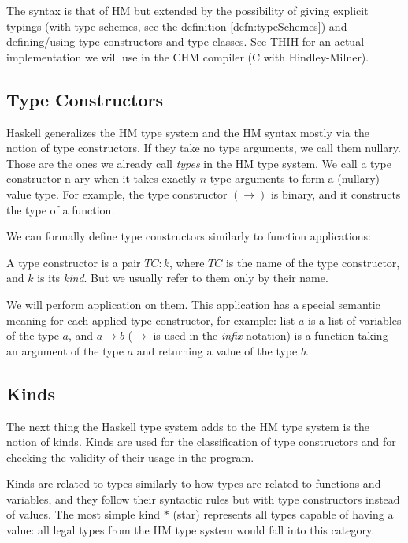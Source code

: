 The syntax is that of HM but extended by the possibility of giving explicit typings (with type schemes, see the definition \ref{defn:typeSchemes}) and defining/using type constructors and type classes. See THIH \cite{jones1999typing} for an actual implementation we will use in the CHM compiler (C with Hindley-Milner).

\subsection{Type Constructors}

Haskell generalizes the HM type system and the HM syntax mostly via the notion of type constructors. If they take no type arguments, we call them nullary. Those are the ones we already call \emph{types} in the HM type system. We call a type constructor n-ary when it takes exactly $n$ type arguments to form a (nullary) value type. For example, the type constructor $(\rightarrow)$ is binary, and it constructs the type of a function.

We can formally define type constructors similarly to function applications:

\begin{defn}
    A type constructor is a pair $TC : k$, where $TC$ is the name of the type constructor, and $k$ is its \emph{kind}. But we usually refer to them only by their name.

    We will perform application on them. This application has a special semantic meaning for each applied type constructor, for example: $\text{list } a$ is a list of variables of the type $a$, and $a \rightarrow b$ ($\rightarrow$ is used in the \emph{infix} notation) is a function taking an argument of the type $a$ and returning a value of the type $b$.
\end{defn}

\subsection{Kinds}

The next thing the Haskell type system adds to the HM type system is the notion of kinds. Kinds are used for the classification of type constructors and for checking the validity of their usage in the program.

Kinds are related to types similarly to how types are related to functions and variables, and they follow their syntactic rules but with type constructors instead of values. The most simple kind $*$ (star) represents all types capable of having a value: all legal types from the HM type system would fall into this category.

